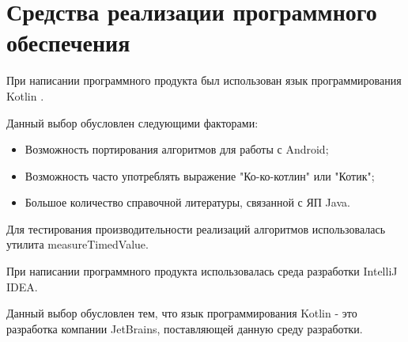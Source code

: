 \documentclass[12pt]{report}
\begin{document}
\section{Средства реализации программного обеспечения}
При написании программного продукта был использован язык программирования Kotlin \cite{Kotlin}.

Данный выбор обусловлен следующими факторами:
\begin{itemize}
\item Возможность портирования алгоритмов для работы с Android;
\item Возможность часто употреблять выражение "Ко-ко-котлин" или "Котик";
\item Большое количество справочной литературы, связанной с ЯП Java.
\end{itemize}

Для тестирования производительности реализаций алгоритмов использовалась утилита measureTimedValue.

При написании программного продукта использовалась среда разработки IntelliJ IDEA.

Данный выбор обусловлен тем, что язык программирования Kotlin - это разработка компании JetBrains, поставляющей данную среду разработки.
\end{document}
